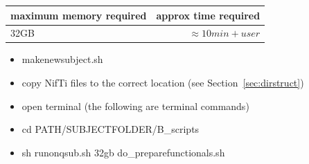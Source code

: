 \documentclass[12pt,a4paper]{scrartcl}
\begin{document}
\begin{table}[h]
\begin{tabular}{l | r}
\toprule
maximum memory required & approx time required\\\toprule
32GB & $\approx 10min+user$ \\\bottomrule
\end{tabular}
\end{table}
\begin{itemize}
\item makenewsubject.sh
\item copy NifTi files to the correct location (see Section~\ref{sec:dirstruct})
\item open terminal (the following are terminal commands)
\item cd PATH/SUBJECTFOLDER/B\_scripts
\item sh runonqsub.sh 32gb do\_preparefunctionals.sh
\end{itemize}
\end{document}

